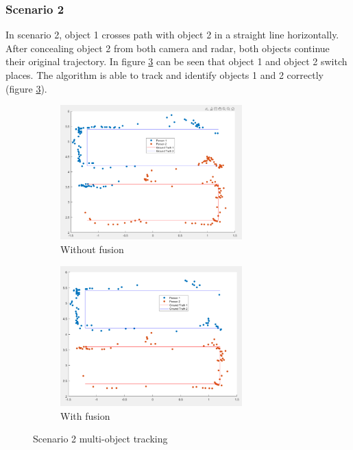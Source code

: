 \subsubsection{Scenario 2}\label{sec:3-exp_result2}
In scenario 2, object 1 crosses path with object 2 in a straight line horizontally.
After concealing object 2 from both camera and radar, both objects continue their original trajectory.
In figure \ref*{fig:scenario_result_2} can be seen that object 1 and object 2 switch places.
The algorithm is able to track and identify objects 1 and 2 correctly (figure \ref*{fig:scenario_result_2}).
\begin{figure}[hbpt]
    \centering
    \begin{subfigure}{0.3\linewidth}
        \includegraphics[width=7cm]{Figures/2_before.png}
        \caption{Without fusion}
        \label{subfig:without_fusion_2}
    \end{subfigure}
    \hspace{0.15\textwidth}
    \begin{subfigure}{0.3\linewidth}
        \includegraphics[width=7cm]{Figures/2_after.png}
        \caption{With fusion}
        \label{subfig:with_fusion_2}
    \end{subfigure}

    \caption{Scenario 2 multi-object tracking}
    \label{fig:scenario_result_2}
\end{figure}

